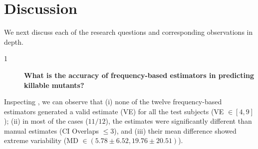 \documentclass[sigconf]{acmart}
\newcommand{\estimatorCount}{twelve\xspace}
\newcommand{\EvosuiteDynamosa}{\textsc{DynaMOSA}\xspace}
\newcommand{\RQA}{\textcircled{1}\xspace}
\newcommand{\RQAx}{%
\begin{description}\item[\RQA]\textbf{What is the accuracy of frequency-based estimators in predicting killable mutants?}\end{description}}
\begin{document}
\begin{table}[h]
\caption{Comparison of \emph{mean difference (MD)} between class and method estimators across subjects---between \EvosuiteDynamosa test suites}
\label{tbl:estdynamosaclassmethod}
\end{table}

\section{Discussion}
\label{sec:discussion}
We next discuss each of the research questions and corresponding observations in depth.
\RQAx

Inspecting , we can observe that
(i) none of the \estimatorCount frequency-based estimators generated a valid estimate (VE) for all the test subjects (VE $\in [4, 9]$);
(ii) in most of the cases ($11/12$), the estimates were significantly different than manual estimates (CI Overlaps $\le 3$), and
(iii) their mean difference showed extreme variability (MD $\in (5.78 \pm 6.52, 19.76 \pm 20.51)$).
\end{document}
